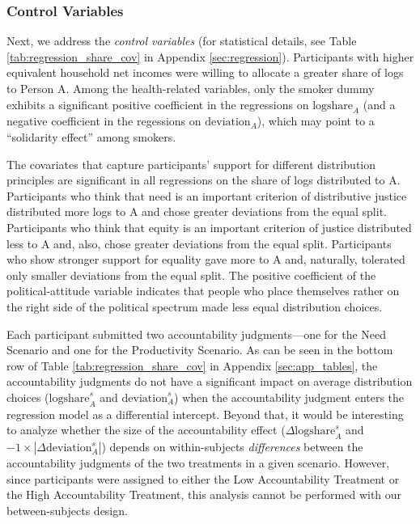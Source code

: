 \documentclass[smallcondensed]{svjour3}
\begin{document}
\subsubsection*{Control Variables}
%
Next, we address the \textit{control variables} (for statistical details, see Table \ref{tab:regression_share_cov} in Appendix \ref{sec:regression}). Participants with higher equivalent household net incomes were willing to allocate a greater share of logs to Person A. Among the health-related variables, only the smoker dummy exhibits a significant positive coefficient in the regressions on $\mbox{logshare}_A$ (and a negative coefficient in the regessions on $\mbox{deviation}_A$), which may point to a ``solidarity effect'' among smokers.\par
%
The covariates that capture participants' support for different distribution principles are significant in all regressions on the share of logs distributed to A. Participants who think that need is an important criterion of distributive justice distributed more logs to A and chose greater deviations from the equal split. Participants who think that equity is an important criterion of justice distributed less to A and, also, chose greater deviations from the equal split. Participants who show stronger support for equality gave more to A and, naturally, tolerated only smaller deviations from the equal split. The positive coefficient of the political-attitude variable indicates that people who place themselves rather on the right side of the political spectrum made less equal distribution choices.\par
%
Each participant submitted two accountability judgments---one for the Need Scenario and one for the Productivity Scenario. As can be seen in the bottom row of Table \ref{tab:regression_share_cov} in Appendix \ref{sec:app_tables}, the accountability judgments do not have a significant impact on average distribution choices ($\mbox{logshare}_A^s$ and $\mbox{deviation}_A^s$) when the accountability judgment enters the regression model as a differential intercept. Beyond that, it would be interesting to analyze whether the size of the accountability effect ($\Delta\mbox{logshare}_A^s$ and $-1\times|\Delta\mbox{deviation}_A^s|$) depends on within-subjects \textit{differences} between the accountability judgments of the two treatments in a given scenario. However, since participants were assigned to either the Low Accountability Treatment or the High Accountability Treatment, this analysis cannot be performed with our between-subjects design.\par
%
\end{document}
